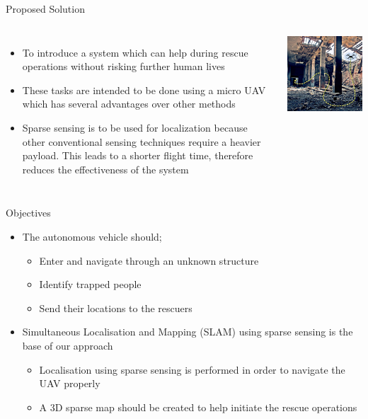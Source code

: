 \documentclass[xcolor=table]{beamer}
\begin{document}
\begin{frame}{Proposed Solution}
  \begin{columns}
  \begin{itemize}
  \item To introduce a system which can help during rescue operations without risking further human lives
  \item These tasks are intended to be done using a micro UAV which has several advantages over other methods  
  \item Sparse sensing is to be used for localization because other conventional sensing techniques require a heavier payload. This leads to a shorter flight time, therefore reduces the effectiveness of the system
  \end{itemize}
  \begin{center}
  \includegraphics[scale=0.6]{Drone_Mobility.jpg}
  \end{center}
  \end{columns}
\end{frame}

\begin{frame}{Objectives}
  \begin{itemize}
  \item The autonomous vehicle should;
    \begin{itemize}
  	\item Enter and navigate through an unknown structure
  	\item Identify trapped people
  	\item Send their locations to the rescuers
  	\end{itemize}
  \item Simultaneous Localisation and Mapping (SLAM) using sparse sensing is the base of our approach
    \begin{itemize}
  	\item Localisation using sparse sensing is performed in order to navigate the UAV properly
  	\item A 3D sparse map should be created to help initiate the rescue operations
  	\end{itemize}
  \end{itemize}
\end{frame}
\end{document}
